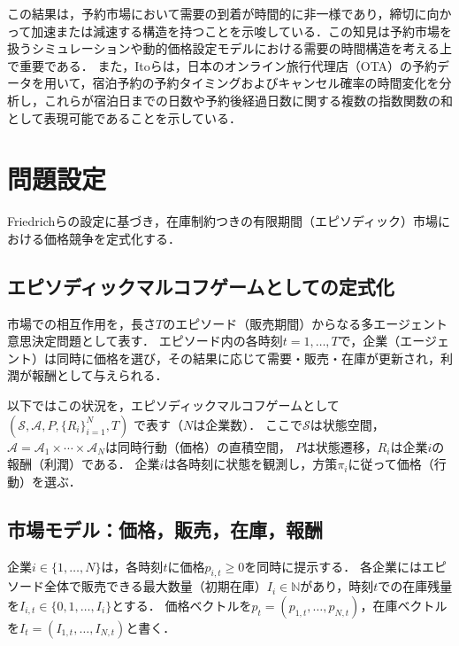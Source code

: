 \documentclass[runningheads]{llncs}
\begin{document}
この結果は，予約市場において需要の到着が時間的に非一様であり，締切に向かって加速または減速する構造を持つことを示唆している．この知見は予約市場を扱うシミュレーションや動的価格設定モデルにおける需要の時間構造を考える上で重要である．
\fi
また，Itoら\cite{ItoEtAl2024ReservationTiming}は，日本のオンライン旅行代理店（OTA）の予約データを用いて，宿泊予約の予約タイミングおよびキャンセル確率の時間変化を分析し，これらが宿泊日までの日数や予約後経過日数に関する複数の指数関数の和として表現可能であることを示している．

\section{問題設定}
\label{sec:problem_statement}

Friedrichら\cite{friedrich2025learning}の設定に基づき，在庫制約つきの有限期間（エピソディック）市場における価格競争を定式化する．

\subsection{エピソディックマルコフゲームとしての定式化}
市場での相互作用を，長さ$T$のエピソード（販売期間）からなる多エージェント意思決定問題として表す．
エピソード内の各時刻$t=1,\dots,T$で，企業（エージェント）は同時に価格を選び，その結果に応じて需要・販売・在庫が更新され，利潤が報酬として与えられる．

以下ではこの状況を，エピソディックマルコフゲームとして
$(\mathcal{S}, \mathcal{A}, P, \{R_i\}_{i=1}^N, T)$
で表す（$N$は企業数）．
ここで$\mathcal{S}$は状態空間，$\mathcal{A}=\mathcal{A}_1\times\cdots\times\mathcal{A}_N$は同時行動（価格）の直積空間，
$P$は状態遷移，$R_i$は企業$i$の報酬（利潤）である．
企業$i$は各時刻に状態を観測し，方策$\pi_i$に従って価格（行動）を選ぶ．

\subsection{市場モデル：価格，販売，在庫，報酬}
企業$i\in\{1,\dots,N\}$は，各時刻$t$に価格$p_{i,t}\ge 0$を同時に提示する．
各企業にはエピソード全体で販売できる最大数量（初期在庫）$I_i\in\mathbb{N}$があり，時刻$t$での在庫残量を$I_{i,t}\in\{0,1,\dots,I_i\}$とする．
価格ベクトルを$p_t=(p_{1,t},\dots,p_{N,t})$，在庫ベクトルを$I_t=(I_{1,t},\dots,I_{N,t})$と書く．
\end{document}
